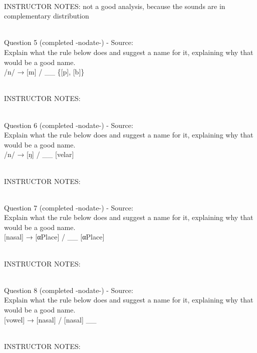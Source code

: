 \documentclass[12pt]{article}
\begin{document}
~\\
INSTRUCTOR NOTES: not a good analysis, because the sounds are in complementary distribution


~\\

{\large Question 5} (completed -nodate-) - Source: \\

Explain what the rule below does and suggest a name for it, explaining why that would be a good name.\\

/n/ → {[m]} / \_\_ \{{[p]}, {[b]}\}


~\\
INSTRUCTOR NOTES: 


~\\

{\large Question 6} (completed -nodate-) - Source: \\

Explain what the rule below does and suggest a name for it, explaining why that would be a good name.\\

/n/ → {[ŋ]} / \_\_ {[velar]}


~\\
INSTRUCTOR NOTES: 


~\\

{\large Question 7} (completed -nodate-) - Source: \\

Explain what the rule below does and suggest a name for it, explaining why that would be a good name.\\

{[nasal]} → {[αPlace]} / \_\_ {[αPlace]}


~\\
INSTRUCTOR NOTES: 


~\\

{\large Question 8} (completed -nodate-) - Source: \\

Explain what the rule below does and suggest a name for it, explaining why that would be a good name.\\

{[vowel]} → {[nasal]} / {[nasal]} \_\_


~\\
INSTRUCTOR NOTES: 


~\\
\end{document}
